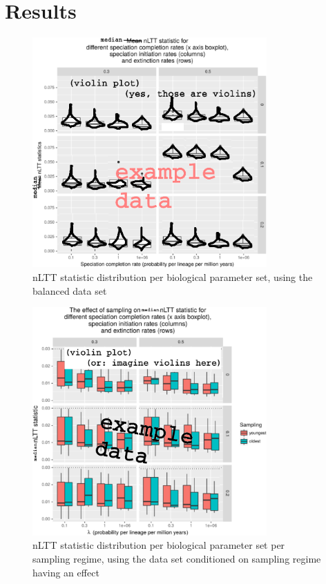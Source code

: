\documentclass{article}
\begin{document}
\section{Results}

\begin{figure}[!htbp]
  \includegraphics[width=0.8\textwidth]{fig_nltt_stats_per_setup.png}
  \caption{
    nLTT statistic distribution per biological parameter set, using the
    balanced data set
  }
\end{figure}

\begin{figure}[!htbp]
  \includegraphics[width=0.8\textwidth]{fig_sampling.png}
  \caption{
    nLTT statistic distribution per biological parameter set per sampling
    regime, using the data set conditioned on sampling regime having an effect 
  }
\end{figure}
\end{document}
